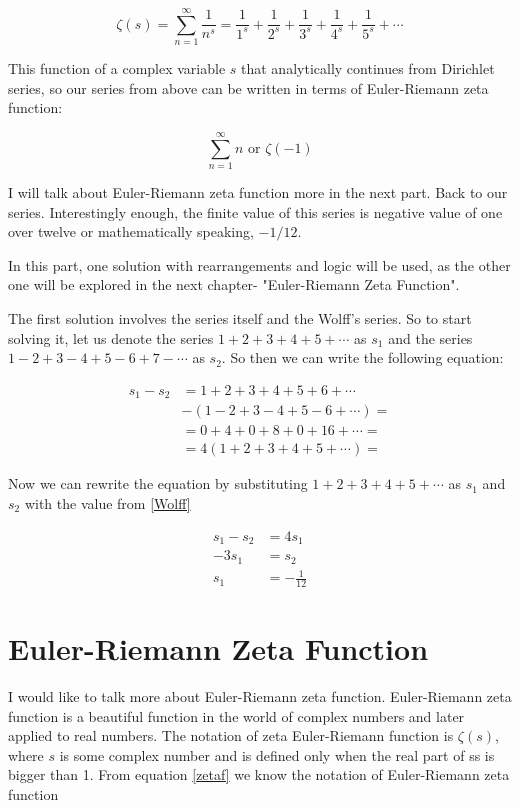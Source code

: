 \documentclass[11pt]{article}
\begin{document}
\begin{equation}
  \zeta(s)=\sum_{n=1}^{\infty} \frac{1}{n^s}=\frac{1}{1^s}+\frac{1}{2^s}+\frac{1}{3^s}+\frac{1}{4^s}+\frac{1}{5^s}+\cdots
  \label{zetaf}
\end{equation}

This function of a complex variable \(s\) that analytically continues from
Dirichlet series, so our series from above can be written in terms of
Euler-Riemann zeta function: 

\begin{equation}
  \sum_{n=1}^{\infty} n \text{ or } \zeta(-1)
  \end{equation}

I will talk about Euler-Riemann zeta function more in the next part. Back to our
series. Interestingly enough, the finite value of this series is negative value
of one over twelve or mathematically speaking, \(-1/12\).

In this part, one solution with rearrangements and logic will be used, as the
other one will be explored in the next chapter- "Euler-Riemann Zeta
Function". 

The first solution involves the series itself and the Wolff's series. So to
start solving it, let us denote the series \(1+2+3+4+5+\cdots\) as \(s_1\) and the
series \(1-2+3-4+5-6+7-\cdots\) as \(s_2\). So then we can write the following equation: 

\begin{align*}
  s_1-s_2&=1+2+3+4+5+6+\cdots\\
  &-(1-2+3-4+5-6+\cdots)=\\
  &=0+4+0+8+0+16+\cdots=\\
  &=4(1+2+3+4+5+\cdots)=
\end{align*}

Now we can rewrite the equation by substituting \(1+2+3+4+5+\cdots\) as \(s_1\) and
\(s_2\) with the value from \ref{Wolff}

\begin{align*}
  s_1-s_2&=4s_1\\
  -3s_1&=s_2\\
  s_1&=-\frac{1}{12}
  \end{align*}

\section{Euler-Riemann Zeta Function}
\label{sec:org77469e6}

I would like to talk more about Euler-Riemann zeta function. Euler-Riemann zeta
function is a beautiful function in the world of complex numbers and later
applied to real numbers. The notation of zeta Euler-Riemann function is
\(\zeta(s)\), where \(s\) is some complex number and is defined only when the real
part of ss is bigger than 1. From equation \ref{zetaf} we know the notation of
Euler-Riemann zeta function 
\end{document}
